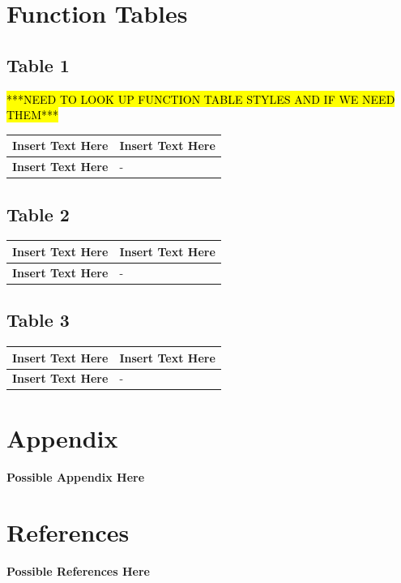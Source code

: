 \documentclass [11pt]{article}
\begin{document}

\section{Function Tables}
\subsection {Table 1}

\hl{***NEED TO LOOK UP FUNCTION TABLE STYLES AND IF WE NEED THEM***}

\begin{longtable}{| p{ } | p{ } | }\hline 
\textbf{Insert Text Here} & \textbf{Insert Text Here} \\ \hline
\textbf{Insert Text Here} & -\\ \hline 
\end{longtable}


\subsection {Table 2 }

\begin{longtable}{| p{ } | p{ } | }\hline 
\textbf{Insert Text Here} & \textbf{Insert Text Here} \\ \hline
\textbf{Insert Text Here} & -\\ \hline 
\end{longtable}


\subsection {Table 3}

\begin{longtable}{| p{ } | p{ } | }\hline 
\textbf{Insert Text Here} & \textbf{Insert Text Here} \\ \hline
\textbf{Insert Text Here} & -\\ \hline 
\end{longtable}




\section{Appendix}
\textbf{Possible Appendix Here}



\section{References}
\textbf{Possible References Here}

\end{document}
